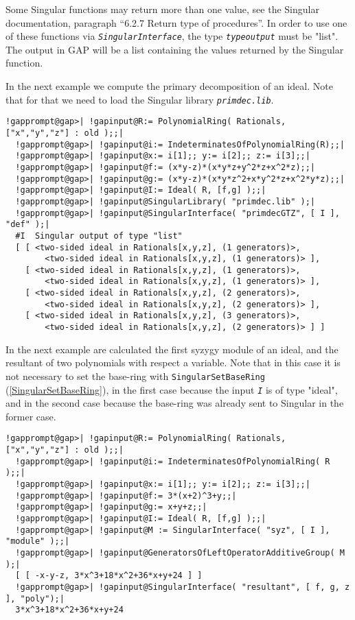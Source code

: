 \documentclass[a4paper,11pt]{report}
\begin{document}
{{{ Some \textsf{Singular} functions may return more than one value, see the \textsf{Singular} documentation, paragraph ``6.2.7 Return type of procedures''. In order to use
one of these functions via \mbox{\texttt{\mdseries\slshape SingularInterface}}, the type \mbox{\texttt{\mdseries\slshape type{\textunderscore}output}} must be "list". The output in \textsf{GAP} will be a list containing the values returned by the \textsf{Singular} function. 

 In the next example we compute the primary decomposition of an ideal. Note
that for that we need to load the \textsf{Singular} library \mbox{\texttt{\mdseries\slshape primdec.lib}}. 
\begin{Verbatim}[commandchars=!@|,fontsize=\small,frame=single,label=Example]
  !gapprompt@gap>| !gapinput@R:= PolynomialRing( Rationals, ["x","y","z"] : old );;|
  !gapprompt@gap>| !gapinput@i:= IndeterminatesOfPolynomialRing(R);;|
  !gapprompt@gap>| !gapinput@x:= i[1];; y:= i[2];; z:= i[3];;|
  !gapprompt@gap>| !gapinput@f:= (x*y-z)*(x*y*z+y^2*z+x^2*z);;|
  !gapprompt@gap>| !gapinput@g:= (x*y-z)*(x*y*z^2+x*y^2*z+x^2*y*z);;|
  !gapprompt@gap>| !gapinput@I:= Ideal( R, [f,g] );;|
  !gapprompt@gap>| !gapinput@SingularLibrary( "primdec.lib" );|
  !gapprompt@gap>| !gapinput@SingularInterface( "primdecGTZ", [ I ], "def" );|
  #I  Singular output of type "list"
  [ [ <two-sided ideal in Rationals[x,y,z], (1 generators)>,
        <two-sided ideal in Rationals[x,y,z], (1 generators)> ],
    [ <two-sided ideal in Rationals[x,y,z], (1 generators)>,
        <two-sided ideal in Rationals[x,y,z], (1 generators)> ],
    [ <two-sided ideal in Rationals[x,y,z], (2 generators)>,
        <two-sided ideal in Rationals[x,y,z], (2 generators)> ],
    [ <two-sided ideal in Rationals[x,y,z], (3 generators)>,
        <two-sided ideal in Rationals[x,y,z], (2 generators)> ] ]
\end{Verbatim}
 In the next example are calculated the first syzygy module of an ideal, and
the resultant of two polynomials with respect a variable. Note that in this
case it is not necessary to set the base-ring with \texttt{SingularSetBaseRing} (\ref{SingularSetBaseRing}), in the first case because the input \mbox{\texttt{\mdseries\slshape I}} is of type "ideal", and in the second case because the base-ring was already
sent to \textsf{Singular} in the former case. 
\begin{Verbatim}[commandchars=!@|,fontsize=\small,frame=single,label=Example]
  !gapprompt@gap>| !gapinput@R:= PolynomialRing( Rationals, ["x","y","z"] : old );;|
  !gapprompt@gap>| !gapinput@i:= IndeterminatesOfPolynomialRing( R );;|
  !gapprompt@gap>| !gapinput@x:= i[1];; y:= i[2];; z:= i[3];;|
  !gapprompt@gap>| !gapinput@f:= 3*(x+2)^3+y;;|
  !gapprompt@gap>| !gapinput@g:= x+y+z;;|
  !gapprompt@gap>| !gapinput@I:= Ideal( R, [f,g] );;|
  !gapprompt@gap>| !gapinput@M := SingularInterface( "syz", [ I ], "module" );;|
  !gapprompt@gap>| !gapinput@GeneratorsOfLeftOperatorAdditiveGroup( M );|
  [ [ -x-y-z, 3*x^3+18*x^2+36*x+y+24 ] ]
  !gapprompt@gap>| !gapinput@SingularInterface( "resultant", [ f, g, z ], "poly");|
  3*x^3+18*x^2+36*x+y+24
\end{Verbatim}
 }

}}
\end{document}
